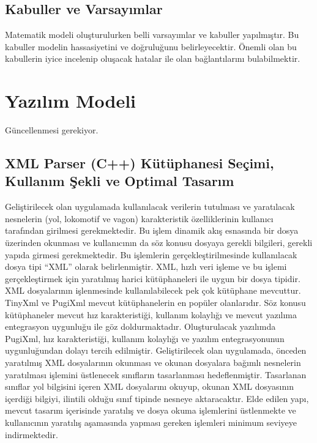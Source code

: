 \documentclass[10pt,a4paper]{article}
\begin{document}
\newpage

\subsection{Kabuller ve Varsayımlar}
Matematik modeli oluşturulurken belli varsayımlar ve kabuller yapılmıştır. Bu kabuller modelin hassasiyetini ve doğruluğunu belirleyecektir. Önemli olan bu kabullerin iyice incelenip oluşacak hatalar ile olan bağlantılarını bulabilmektir.

\newpage
\section{Yazılım Modeli}
Güncellenmesi gerekiyor.
\subsection{XML Parser (C++) Kütüphanesi Seçimi, Kullanım Şekli ve Optimal Tasarım}
Geliştirilecek olan uygulamada kullanılacak verilerin tutulması ve yaratılacak nesnelerin (yol, lokomotif ve vagon) karakteristik özelliklerinin kullanıcı tarafından girilmesi gerekmektedir. Bu işlem dinamik akış esnasında bir dosya üzerinden okunması ve kullanıcının da söz konusu dosyaya gerekli bilgileri, gerekli yapıda girmesi gerekmektedir. Bu işlemlerin gerçekleştirilmesinde kullanılacak dosya tipi “XML” olarak belirlenmiştir. XML, hızlı veri işleme ve bu işlemi gerçekleştirmek için yaratılmış harici kütüphaneleri ile uygun bir  dosya tipidir. 
XML dosyalarının işlenmesinde kullanılabilecek pek çok kütüphane mevcuttur. TinyXml ve PugiXml mevcut kütüphanelerin en popüler olanlarıdır. Söz konusu kütüphaneler mevcut hız karakteristiği, kullanım kolaylığı ve mevcut yazılıma entegrasyon uygunluğu ile göz doldurmaktadır.
Oluşturulacak yazılımda PugiXml,  hız karakteristiği, kullanım kolaylığı ve yazılım entegrasyonunun uygunluğundan dolayı tercih edilmiştir.
Geliştirilecek olan uygulamada, önceden yaratılmış XML dosyalarının okunması ve okunan dosyalara bağımlı nesnelerin yaratılması işlemini üstlenecek sınıfların tasarlanması hedeflenmiştir. Tasarlanan sınıflar yol bilgisini içeren XML dosyalarını okuyup, okunan XML dosyasının içerdiği bilgiyi, ilintili olduğu sınıf tipinde nesneye aktaracaktır.
Elde edilen yapı, mevcut tasarım içerisinde yaratılış ve dosya okuma işlemlerini üstlenmekte ve kullanıcının yaratılış aşamasında yapması gereken işlemleri minimum seviyeye indirmektedir.
\end{document}
